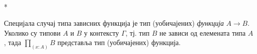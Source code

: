 \documentclass[12pt,oneside]{memoir}
\begin{document}
\begin{samepage}
    \begin{center}
    \begin{minipage}{0.3\textwidth}
        \begin{prooftree}
        \end{prooftree}
    \end{minipage}
    \begin{minipage}{0.35\textwidth}
        \begin{prooftree}
        \end{prooftree}
    \end{minipage}
    \begin{minipage}{0.3\textwidth}
        \begin{prooftree}
        \end{prooftree}
    \end{minipage}
    \\*
    \bigskip%
    \begin{minipage}{0.4\textwidth}
        \begin{prooftree}
        \end{prooftree}
    \end{minipage}
    \begin{minipage}{0.4\textwidth}
        \begin{prooftree}
        \end{prooftree}
    \end{minipage}
    \end{center}
\end{samepage}

Специјала случај типа зависних функција је тип (уобичајених) \emph{функција} $A \to B$. Уколико су типови $A$ и $B$ у контексту $\Gamma$, тј. тип $B$ не зависи од елемената типа $A$, тада $\prod_{(x:A)} B$ представља тип (уобичајених) функција. 
\end{document}
